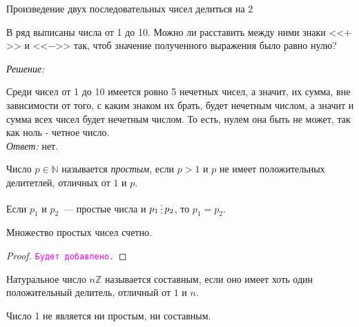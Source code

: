 \documentclass[11pt]{article}
\begin{document}
\begin{theorem}

	 Произведение двух последовательных чисел делиться на 2\\

\end{theorem}


\begin{example}

	В ряд выписаны числа от 1 до 10. Можно ли расставить между ними знаки <<$+$>> и <<$-$>> так, чтоб значение полученного выражения было равно нулю?

\end{example}

\textit{Решение:}

Среди чисел от 1 до 10 имеется ровно 5 нечетных чисел, а значит, их сумма, вне зависимости от того, с каким знаком их брать, будет нечетным числом, а значит и сумма всех чисел будет нечетным числом. То есть, нулем она быть не может, так как ноль - четное число.\\

\textit{Ответ:} нет.

\begin{definition}
    Число $p \in \mathbb{N}$ называется \emph{простым}, если $p > 1$ и $p$ не имеет положительных делитетлей, отличных от $1$ и $p$.
\end{definition}

\begin{statement}
	Если $p_1$ и $p_2$~--- простые числа и $p_1 \divisible p_2$, то $p_1 = p_2$.
\end{statement}

\begin{theorem}[Евклид]

    Множество простых чисел счетно.

\end{theorem}

\begin{proof}
	\textcolor{magenta}{\texttt{Будет добавлено.}}

\end{proof}

\begin{definition}

	Натуральное число $n \mathbb{Z}$ называется составным, если оно имеет хоть один положительный делитель, отличный от $1$ и $n$.

\end{definition}

\begin{remark}

	Число 1 не является ни простым, ни составным.

\end{remark}
\end{document}
